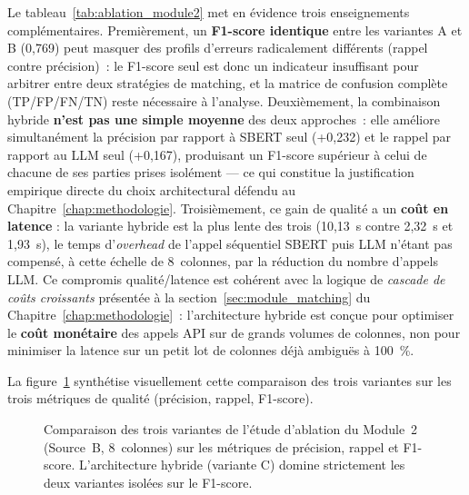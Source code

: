 Le tableau~\ref{tab:ablation_module2} met en évidence trois
enseignements complémentaires. Premièrement, un \textbf{F1-score
identique} entre les variantes A et B (0,769) peut masquer des profils
d'erreurs radicalement différents (rappel contre précision)~: le
F1-score seul est donc un indicateur insuffisant pour arbitrer entre
deux stratégies de matching, et la matrice de confusion complète
(TP/FP/FN/TN) reste nécessaire à l'analyse. Deuxièmement, la
combinaison hybride \textbf{n'est pas une simple moyenne} des deux
approches~: elle améliore simultanément la précision par rapport à
SBERT seul (+0,232) et le rappel par rapport au LLM seul (+0,167),
produisant un F1-score supérieur à celui de chacune de ses parties
prises isolément --- ce qui constitue la justification empirique
directe du choix architectural défendu au
Chapitre~\ref{chap:methodologie}. Troisièmement, ce gain de qualité a
un \textbf{coût en latence} : la variante hybride est la plus lente
des trois (10,13~s contre 2,32~s et 1,93~s), le temps
d'\textit{overhead} de l'appel séquentiel SBERT puis LLM n'étant pas
compensé, à cette échelle de 8~colonnes, par la réduction du nombre
d'appels LLM. Ce compromis qualité/latence est cohérent avec la
logique de \textit{cascade de coûts croissants} présentée à la
section~\ref{sec:module_matching} du Chapitre~\ref{chap:methodologie}~:
l'architecture hybride est conçue pour optimiser le \textbf{coût
monétaire} des appels API sur de grands volumes de colonnes, non pour
minimiser la latence sur un petit lot de colonnes déjà ambiguës à
100~\%.

La figure~\ref{fig:ablation_f1} synthétise visuellement cette
comparaison des trois variantes sur les trois métriques de qualité
(précision, rappel, F1-score).

\begin{figure}[H]
\centering
{}
\caption{Comparaison des trois variantes de l'étude d'ablation du
        Module~2 (Source~B, 8~colonnes) sur les métriques de
        précision, rappel et F1-score. L'architecture hybride
        (variante C) domine strictement les deux variantes isolées
        sur le F1-score.}
\label{fig:ablation_f1}
\end{figure}

